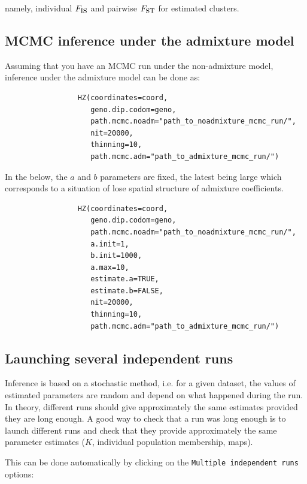 \documentclass{article}
\newcommand{\Fst}{F_{\mbox{\footnotesize ST}}}
\newcommand{\Fis}{F_{\mbox{\footnotesize IS}}}
\begin{document}
namely, individual  $\Fis$ and pairwise $\Fst$ for estimated clusters.

\clearpage
\subsection{MCMC inference under the admixture model}
 Assuming that you have an MCMC run under the non-admixture model, inference under the admixture model can be done as:
\begin{verbatim}
                 HZ(coordinates=coord,
                    geno.dip.codom=geno,
                    path.mcmc.noadm="path_to_noadmixture_mcmc_run/",
                    nit=20000,
                    thinning=10,
                    path.mcmc.adm="path_to_admixture_mcmc_run/")  

\end{verbatim}


In the below, the $a$ and $b$ parameters are fixed, the latest being large which corresponds to a situation of lose 
spatial structure of admixture coefficients. 
\begin{verbatim}
                 HZ(coordinates=coord,
                    geno.dip.codom=geno,
                    path.mcmc.noadm="path_to_noadmixture_mcmc_run/",
                    a.init=1,
                    b.init=1000,
                    a.max=10,
                    estimate.a=TRUE,
                    estimate.b=FALSE,
                    nit=20000,
                    thinning=10,
                    path.mcmc.adm="path_to_admixture_mcmc_run/")  

\end{verbatim}




\clearpage
\subsection{Launching several independent runs}

Inference is based on a stochastic method, i.e. for a given dataset, the values of estimated parameters are random and depend 
on what happened during the run. In theory, different runs should give approximately the same estimates provided they are long enough. 
A good way to check that a run was long enough is to launch different runs and check that they provide approximately the same parameter estimates 
($K$, individual population membership, maps).

This can be done automatically by clicking on the \texttt{Multiple independent runs} options:\\
\bigskip
\end{document}
